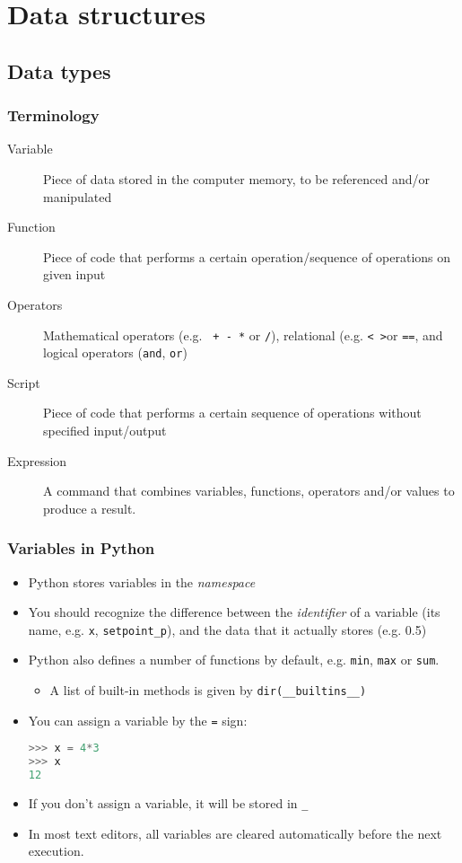 \section{Data structures}
\subsection{Data types}
\begin{frame}
 \frametitle{Terminology}
 \begin{description}
  \item[Variable] Piece of data stored in the computer memory, to be referenced and/or manipulated
  \item[Function] Piece of code that performs a certain operation/sequence of operations on given input
  \item[Operators] Mathematical operators (e.g. \lstinline$ + - *$ or \lstinline$/$), relational (e.g. \lstinline$< >$or \lstinline$==$, and logical operators (\lstinline$and$, \lstinline$or$)
  \item[Script] Piece of code that performs a certain sequence of operations without specified input/output
  \item[Expression] A command that combines variables, functions, operators and/or values to produce a result.
 \end{description}
\end{frame}

\begin{frame}[fragile]
 \frametitle{Variables in Python}
  \begin{itemize}
    \item Python stores variables in the \emph{namespace}\pause
    \item You should recognize the difference between the \emph{identifier} of a variable (its name, e.g. \lstinline$x$, \lstinline$setpoint_p$), and the data that it actually stores (e.g. 0.5)\pause
    \item Python also defines a number of functions by default, e.g. \lstinline$min$, \lstinline$max$ or \lstinline$sum$.
    \begin{itemize}
      \item A list of built-in methods is given by \lstinline$dir(__builtins__)$
    \end{itemize}
    \pause
    \item You can assign a variable by the \lstinline$=$ sign:
   \begin{lstlisting}[language=Python, numbers=none]
>>> x = 4*3
>>> x
12
   \end{lstlisting}\pause
   \item If you don't assign a variable, it will be stored in \lstinline$_$
   \item In most text editors, all variables are cleared automatically before the next execution. 
 \end{itemize}
\end{frame}

